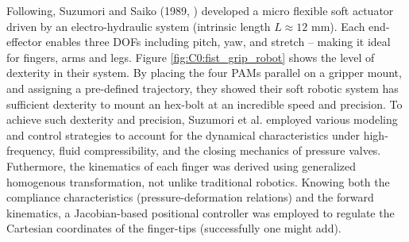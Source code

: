 Following, Suzumori and Saiko (1989, \cite{Suzumori1991,Suzumori1992}) developed a micro flexible soft actuator driven by an electro-hydraulic system (intrinsic length $L \approx12$ \si{\milli \meter}). Each end-effector enables three DOFs including pitch, yaw, and stretch -- making it ideal for fingers, arms and legs. Figure \ref{fig:C0:fist_grip_robot} shows the level of dexterity in their system. By placing the four PAMs parallel on a gripper mount, and assigning a pre-defined trajectory, they showed their soft robotic system has sufficient dexterity to mount an hex-bolt at an incredible speed and precision. To achieve such dexterity and precision, Suzumori et al. \cite{Suzumori1991} employed various modeling and control strategies to account for the dynamical characteristics under high-frequency, fluid compressibility, and the closing mechanics of pressure valves. Futhermore, the kinematics of each finger was derived using generalized homogenous transformation, not unlike traditional robotics. Knowing both the compliance characteristics (pressure-deformation relations) and the forward kinematics, a Jacobian-based positional controller was employed to regulate the Cartesian coordinates of the finger-tips (successfully one might add).
%
